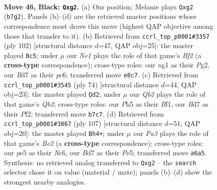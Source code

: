 \documentclass[11pt]{article}
\begin{document}
\clearpage

\begin{figure}[p]\centering
\begin{subfigure}{0.46\textwidth}\centering
\resizebox{\linewidth}{!}{%
\newchessgame
\chessboard[
  setfen={4n3/1q1b2k1/p7/4Pp1p/3P2p1/N7/5PPP/Q3K1N1 b - - 0 46},
  showmover=false,
  pgfstyle=straightmove, color=movearrow, markmove={b7-g2}
]}
\caption{}
\end{subfigure}\hfill
\begin{subfigure}{0.46\textwidth}\centering
\resizebox{\linewidth}{!}{%
\newchessgame
\chessboard[
  setfen={2q3k1/5pp1/p1p2n1p/8/PP6/5P1P/4QBP1/6K1 w - - 1 52},
  showmover=false,
  pgfstyle=straightmove, color=movearrow, markmove={f2-c5}
]}
\caption{}
\end{subfigure}
\\[4pt]
\begin{subfigure}{0.46\textwidth}\centering
\resizebox{\linewidth}{!}{%
\newchessgame
\chessboard[
  setfen={6k1/2qn1pp1/4p1p1/p7/1n4P1/1P2PN1P/1Q3P2/5BK1 w - - 0 38},
  showmover=false,
  pgfstyle=straightmove, color=movearrow, markmove={b2-d2}
]}
\caption{}
\end{subfigure}\hfill
\begin{subfigure}{0.46\textwidth}\centering
\resizebox{\linewidth}{!}{%
\newchessgame
\chessboard[
  setfen={8/4b3/1kn5/4p3/p3N3/1pPQNP2/1P5q/4K3 b - - 7 54},
  showmover=false,
  pgfstyle=straightmove, color=movearrow, markmove={e7-h4}
]}
\caption{}
\end{subfigure}
\caption{\textbf{Move 46, Black: \texttt{Qxg2}.} (a) Our position; Melanie plays \texttt{Qxg2} (\texttt{b7g2}). Panels (b)--(d) are the retrieved master positions whose correspondence most drove this move (highest QAP objective among those that transfer to it). (b) Retrieved from \texttt{ccrl\_top\_p0001\#3357} (ply 102) [structural distance $d$=47, QAP obj=25]: the master played \texttt{Bc5}; under $\mu$ our \emph{Ne1} plays the role of that game's \emph{Bf2} (a \textbf{cross-type} correspondence); cross-type roles: our \emph{n}g1 as their \emph{P}g2, our \emph{B}d7 as their \emph{p}c6; transferred move \texttt{e8c7}. (c) Retrieved from \texttt{ccrl\_top\_p0001\#3545} (ply 74) [structural distance $d$=44, QAP obj=23]: the master played \texttt{Qd2}; under $\mu$ our \emph{Qb2} plays the role of that game's \emph{Qb2}; cross-type roles: our \emph{P}h5 as their \emph{B}f1, our \emph{B}d7 as their \emph{P}f2; transferred move \texttt{b7c7}. (d) Retrieved from \texttt{ccrl\_top\_p0001\#3867} (ply 107) [structural distance $d$=51, QAP obj=20]: the master played \texttt{Bh4+}; under $\mu$ our \emph{Pa3} plays the role of that game's \emph{Be2} (a \textbf{cross-type} correspondence); cross-type roles: our \emph{p}e5 as their \emph{N}c6, our \emph{B}d7 as their \emph{P}e5; transferred move \texttt{a6a5}. Synthesis: no retrieved analog transferred to \texttt{Qxg2} -- the \texttt{search} selector chose it on value (material / mate); panels (b)--(d) show the strongest nearby analogies.}
\label{fig:thought-m91}
\end{figure}
\end{document}
